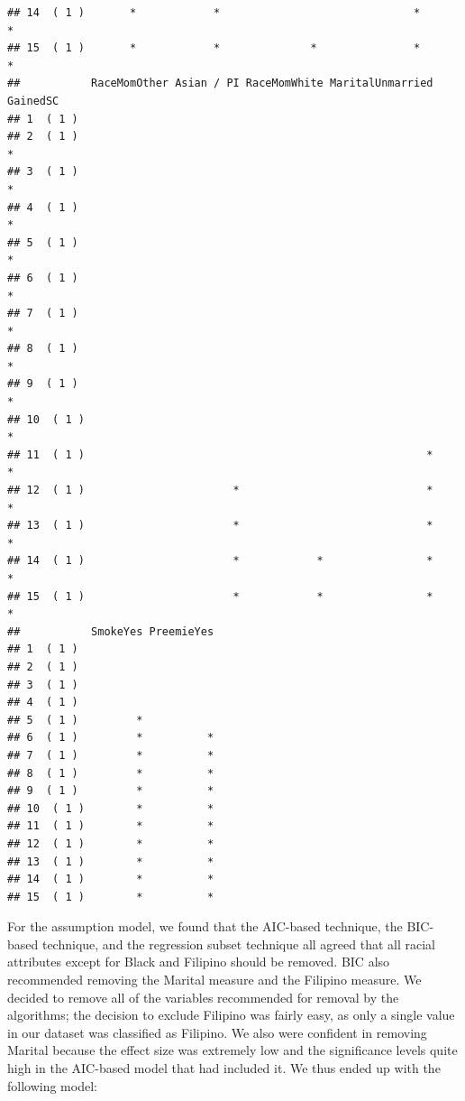 \documentclass{article}\usepackage[]{graphicx}\usepackage[]{xcolor}
\makeatletter
\newenvironment{kframe}{%
 \def\at@end@of@kframe{}%
 \ifinner\ifhmode%
  \def\at@end@of@kframe{\end{minipage}}%
  \begin{minipage}{\columnwidth}%
 \fi\fi%
 \def\FrameCommand##1{\hskip\@totalleftmargin \hskip-\fboxsep
 \colorbox{shadecolor}{##1}\hskip-\fboxsep
     \hskip-\linewidth \hskip-\@totalleftmargin \hskip\columnwidth}%
 \MakeFramed {\advance\hsize-\width
   \@totalleftmargin\z@ \linewidth\hsize
   \@setminipage}}%
 {\par\unskip\endMakeFramed%
 \at@end@of@kframe}
\newenvironment{knitrout}{}{} %
\makeatother
\begin{document}
\begin{knitrout}
\begin{kframe}
\begin{verbatim}
## 14  ( 1 )       *            *                              *               *
## 15  ( 1 )       *            *              *               *               *
##           RaceMomOther Asian / PI RaceMomWhite MaritalUnmarried GainedSC
## 1  ( 1 )                                                                
## 2  ( 1 )                                                               *
## 3  ( 1 )                                                               *
## 4  ( 1 )                                                               *
## 5  ( 1 )                                                               *
## 6  ( 1 )                                                               *
## 7  ( 1 )                                                               *
## 8  ( 1 )                                                               *
## 9  ( 1 )                                                               *
## 10  ( 1 )                                                              *
## 11  ( 1 )                                                     *        *
## 12  ( 1 )                       *                             *        *
## 13  ( 1 )                       *                             *        *
## 14  ( 1 )                       *            *                *        *
## 15  ( 1 )                       *            *                *        *
##           SmokeYes PreemieYes
## 1  ( 1 )                     
## 2  ( 1 )                     
## 3  ( 1 )                     
## 4  ( 1 )                     
## 5  ( 1 )         *           
## 6  ( 1 )         *          *
## 7  ( 1 )         *          *
## 8  ( 1 )         *          *
## 9  ( 1 )         *          *
## 10  ( 1 )        *          *
## 11  ( 1 )        *          *
## 12  ( 1 )        *          *
## 13  ( 1 )        *          *
## 14  ( 1 )        *          *
## 15  ( 1 )        *          *
\end{verbatim}
\end{kframe}
\end{knitrout}

For the assumption model, we found that the AIC-based technique, the BIC-based technique, and the regression subset technique all agreed that all racial attributes except for Black and Filipino should be removed. BIC also recommended removing the Marital measure and the Filipino measure. We decided to remove all of the variables recommended for removal by the algorithms; the decision to exclude Filipino was fairly easy, as only a single value in our dataset was classified as Filipino. We also were confident in removing Marital because the effect size was extremely low and the significance levels quite high in the AIC-based model that had included it. We thus ended up with the following model: 
\end{document}
